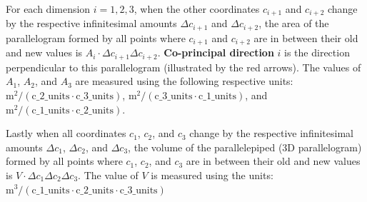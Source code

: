 \documentclass{book}
\begin{document}
For each dimension \(i = 1, 2, 3\), when the other coordinates \(c_{i+1}\) and \(c_{i+2}\) change by the respective infinitesimal amounts \(\Delta c_{i+1}\) and \(\Delta c_{i+2}\), the area of the parallelogram formed by all points where \(c_{i+1}\) and \(c_{i+2}\) are in between their old and new values is \(A_i \cdot \Delta c_{i+1} \Delta c_{i+2}\). {\bf Co-principal direction} \(i\) is the direction perpendicular to this parallelogram (illustrated by the red arrows). The values of \(A_1\), \(A_2\), and \(A_3\) are measured using the following respective units: \(\text{m}^2/(\text{c\_2\_units} \cdot \text{c\_3\_units})\), \(\text{m}^2/(\text{c\_3\_units} \cdot \text{c\_1\_units})\), and \(\text{m}^2/(\text{c\_1\_units} \cdot \text{c\_2\_units})\).     

Lastly when all coordinates \(c_1\), \(c_2\), and \(c_3\) change by the respective infinitesimal amounts \(\Delta c_1\), \(\Delta c_2\), and \(\Delta c_3\), the volume of the parallelepiped (3D parallelogram) formed by all points where \(c_1\), \(c_2\), and \(c_3\) are in between their old and new values is \(V \cdot \Delta c_1 \Delta c_2 \Delta c_3\). The value of \(V\) is measured using the units: \(\text{m}^3/(\text{c\_1\_units} \cdot \text{c\_2\_units} \cdot \text{c\_3\_units})\) 
\end{document}
